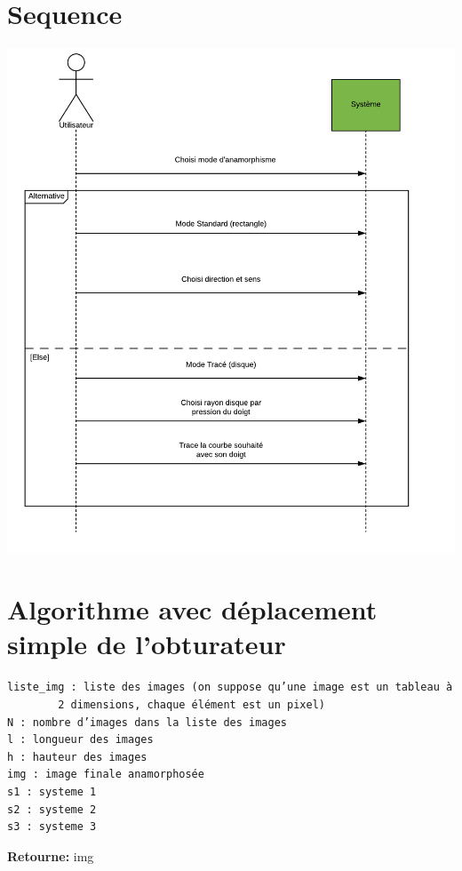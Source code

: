 \documentclass[a4paper,12pt]{report}
\begin{document}
\section{Sequence}
\begin{center}
 \includegraphics[scale=0.7]{./Sequence.png}
\end{center}
\newpage
\section{Algorithme avec déplacement simple de l'obturateur}
\begin{verbatim}
liste_img : liste des images (on suppose qu’une image est un tableau à 
	    2 dimensions, chaque élément est un pixel)
N : nombre d’images dans la liste des images
l : longueur des images
h : hauteur des images
img : image finale anamorphosée
s1 : systeme 1
s2 : systeme 2
s3 : systeme 3
\end{verbatim}

\noindent\textbf{Retourne:} img \bigskip
\end{document}
